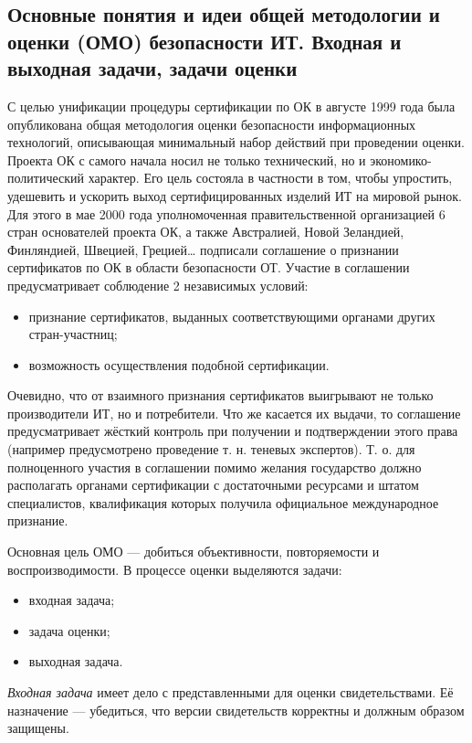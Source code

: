 \documentclass[12pt, russian, oneside, article]{ncc}
\begin{document}
\subsection{Основные понятия и идеи общей методологии и оценки (ОМО) безопасности ИТ. Входная и выходная задачи, задачи оценки}
\label{sec-3_5}


С целью унификации процедуры сертификации по ОК в августе 1999 года была опубликована общая методология оценки безопасности информационных технологий, описывающая минимальный набор действий при проведении оценки. Проекта ОК с самого начала носил не только технический, но и экономико-политический характер. Его цель состояла в частности в том, чтобы упростить, удешевить и ускорить выход сертифицированных изделий ИТ на мировой рынок. Для этого в мае 2000 года уполномоченная правительственной организацией 6 стран основателей проекта ОК, а также Австралией, Новой Зеландией, Финляндией, Швецией, Грецией\ldots{} подписали соглашение о признании сертификатов по ОК в области безопасности ОТ. Участие в соглашении предусматривает соблюдение 2 независимых условий:
\begin{itemize}
\item признание сертификатов, выданных соответствующими органами других стран-участниц;
\item возможность осуществления подобной сертификации.
\end{itemize}

Очевидно, что от взаимного признания сертификатов выигрывают не только производители ИТ, но и потребители. Что же касается их выдачи, то соглашение предусматривает жёсткий контроль при получении и подтверждении этого права (например предусмотрено проведение т. н. теневых экспертов). Т. о. для полноценного участия в соглашении помимо желания государство должно располагать органами сертификации с достаточными ресурсами и штатом специалистов, квалификация которых получила официальное международное признание.

Основная цель ОМО --- добиться объективности, повторяемости и воспроизводимости. В процессе оценки выделяются задачи:
\begin{itemize}
\item входная задача;
\item задача оценки;
\item выходная задача.
\end{itemize}

\emph{Входная задача} имеет дело с представленными для оценки свидетельствами. Её назначение --- убедиться, что версии свидетельств корректны и должным образом защищены.
\end{document}
